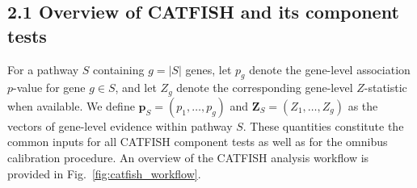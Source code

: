 \documentclass[unnumsec,webpdf,contemporary,large]{oup-authoring-template}%
\theoremstyle{thmstyleone}%
\theoremstyle{thmstyletwo}%
\theoremstyle{thmstylethree}%
\begin{document}
\subsection*{2.1 Overview of CATFISH and its component tests}

For a pathway $S$ containing $g = |S|$ genes, let $p_g$ denote the gene-level association $p$-value for gene $g \in S$, and let $Z_g$ denote the corresponding gene-level $Z$-statistic when available. We define $\mathbf{p}_S = (p_1, \dots, p_g)$ and $\mathbf{Z}_S = (Z_1, \dots, Z_g)$ as the vectors of gene-level evidence within pathway $S$. These quantities constitute the common inputs for all CATFISH component tests as well as for the omnibus calibration procedure. An overview of the CATFISH analysis workflow is provided in Fig.~\ref{fig:catfish_workflow}.
\end{document}
